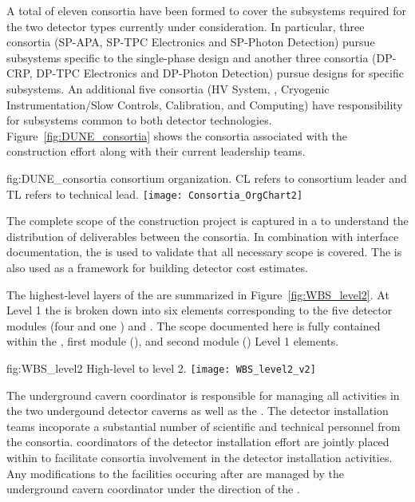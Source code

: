 A total of eleven  consortia have been formed to cover 
the subsystems required for the two detector types currently under
consideration.  In particular, three consortia (SP-APA, SP-TPC
Electronics and SP-Photon Detection) pursue subsystems specific to
the single-phase design and another three consortia (DP-CRP, DP-TPC
Electronics and DP-Photon Detection) pursue designs for 
specific subsystems.  An additional five consortia (HV System, ,
Cryogenic Instrumentation/Slow Controls, Calibration, and Computing)
have responsibility for subsystems common to both detector
technologies.  Figure~\ref{fig:DUNE_consortia} shows the consortia 
associated with the  construction effort along with their 
current leadership teams.  
\begin{dunefigure}{fig:DUNE_consortia}
  { consortium organization. CL refers to consortium leader
    and TL refers to technical lead.}
  \texttt{[image: Consortia\_OrgChart2]}
\end{dunefigure}

The complete scope of the  construction project is captured in a 
 to understand the distribution of deliverables between 
the consortia.  In combination with interface documentation, the 
 is used to validate that all necessary scope is covered.  The 
 is also used as a framework for building  
detector cost estimates. 

The highest-level layers of the   are summarized 
in Figure~\ref{fig:WBS_level2}.  At Level 1 the  is broken down into 
six elements corresponding to the five  detector modules (four 
 and one ) and .  The scope documented
here is fully contained within the , first  module 
(), and second  module () Level 1 elements.   
\begin{dunefigure}{fig:WBS_level2}
  {High-level   to level 2.}
  \texttt{[image: WBS\_level2\_v2]}
\end{dunefigure}

The underground cavern coordinator is responsible for managing all 
activities in the two undergound detector caverns as well as the
. The detector
installation teams incoporate a substantial number of scientific and
technical personnel from the  consortia.   coordinators 
of the detector installation effort are jointly placed within 
  to facilitate consortia involvement in the 
detector installation activities.  Any modifications to the facilities 
occuring after  are managed by the underground cavern 
coordinator under the direction of the .

